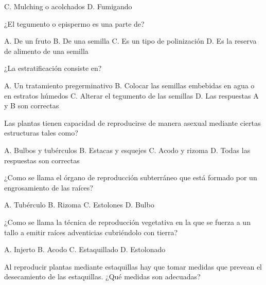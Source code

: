 \documentclass[11pt]{exam}
\begin{document}
{\begin{questions}
\begin{checkboxes}
    \CorrectChoice C. Mulching o acolchados
    \choice D. Fumigando
  \end{checkboxes}
\question ¿El tegumento o epispermo es una parte de?
  \begin{checkboxes}
    \choice A. De un fruto
    \CorrectChoice B. De una semilla
    \choice C. Es un tipo de polinización
    \choice D. Es la reserva de alimento de una semilla
  \end{checkboxes}
\question ¿La estratificación consiste en?
  \begin{checkboxes}
    \choice A. Un tratamiento pregerminativo
    \choice B. Colocar las semillas embebidas en agua o en estratos húmedos
    \choice C. Alterar el tegumento de las semillas
    \CorrectChoice D. Las respuestas A y B son correctas
  \end{checkboxes}
\question Las plantas tienen capacidad de reproducirse de manera asexual mediante
  ciertas estructuras tales como?
  \begin{checkboxes}
    \CorrectChoice A. Bulbos y tubérculos
    \choice B. Estacas y esquejes
    \choice C. Acodo y rizoma
    \choice D. Todas las respuestas son correctas 
  \end{checkboxes}
\question ¿Como se llama el órgano de reproducción subterráneo que está formado
  por un engrosamiento de las raíces?
  \begin{checkboxes}
    \CorrectChoice A. Tubérculo
    \choice B. Rizoma
    \choice C. Estolones
    \choice D. Bulbo    
  \end{checkboxes}
\question ¿Como se llama la técnica de reproducción vegetativa en la que se
  fuerza a un tallo a emitir raíces adventicias cubriéndolo con tierra?
  \begin{checkboxes}
    \choice A. Injerto
    \CorrectChoice B. Acodo
    \choice C. Estaquillado
    \choice D. Estolonado
  \end{checkboxes}
\question Al reproducir plantas mediante estaquillas hay que tomar medidas que prevean el
  desecamiento de las estaquillas. ¿Qué medidas son adecuadas?

\end{questions}}
\end{document}
